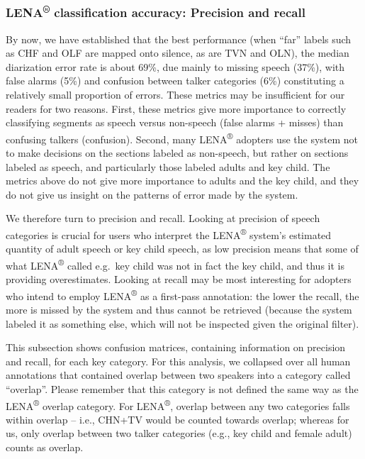 \documentclass[english,floatsintext,man]{apa6}
\begin{document}
\subsubsection{\texorpdfstring{LENA\textsuperscript{®} classification
accuracy: Precision and
recall}{LENA® classification accuracy: Precision and recall}}\label{lena-classification-accuracy-precision-and-recall}

By now, we have established that the best performance (when
\enquote{far} labels such as CHF and OLF are mapped onto silence, as are
TVN and OLN), the median diarization error rate is about 69\%, due
mainly to missing speech (37\%), with false alarms (5\%) and confusion
between talker categories (6\%) constituting a relatively small
proportion of errors. These metrics may be insufficient for our readers
for two reasons. First, these metrics give more importance to correctly
classifying segments as speech versus non-speech (false alarms + misses)
than confusing talkers (confusion). Second, many LENA\textsuperscript{®}
adopters use the system not to make decisions on the sections labeled as
non-speech, but rather on sections labeled as speech, and particularly
those labeled adults and key child. The metrics above do not give more
importance to adults and the key child, and they do not give us insight
on the patterns of error made by the system.

We therefore turn to precision and recall. Looking at precision of
speech categories is crucial for users who interpret the
LENA\textsuperscript{®} system's estimated quantity of adult speech or
key child speech, as low precision means that some of what
LENA\textsuperscript{®} called e.g.~key child was not in fact the key
child, and thus it is providing overestimates. Looking at recall may be
most interesting for adopters who intend to employ
LENA\textsuperscript{®} as a first-pass annotation: the lower the
recall, the more is missed by the system and thus cannot be retrieved
(because the system labeled it as something else, which will not be
inspected given the original filter).

This subsection shows confusion matrices, containing information on
precision and recall, for each key category. For this analysis, we
collapsed over all human annotations that contained overlap between two
speakers into a category called \enquote{overlap}. Please remember that
this category is not defined the same way as the LENA\textsuperscript{®}
overlap category. For LENA\textsuperscript{®}, overlap between any two
categories falls within overlap -- i.e., CHN+TV would be counted towards
overlap; whereas for us, only overlap between two talker categories
(e.g., key child and female adult) counts as overlap.
\end{document}

